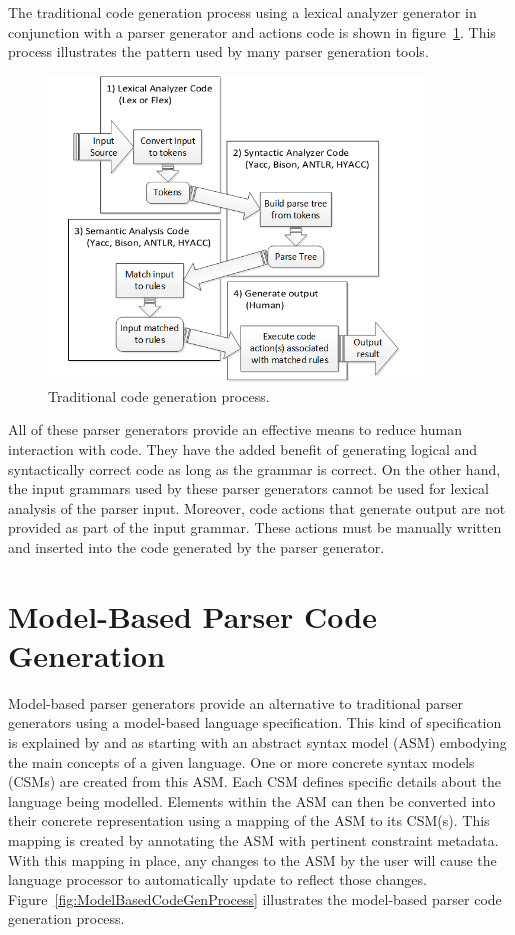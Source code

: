\indent
The traditional code generation process using a lexical analyzer generator in conjunction with a parser generator and actions code is shown in figure~\ref{fig:TraditionalCodeGenProcess}.  This process illustrates the pattern used by many parser generation tools.

\begin{figure}[h!]
\centering
\includegraphics[width=0.9\textwidth]{figures/TraditionalCodeGenProcess.png}
\caption{Traditional code generation process.}
\label{fig:TraditionalCodeGenProcess}
\end{figure}

\indent
All of these parser generators provide an effective means to reduce human interaction with code.  They have the added benefit of generating logical and syntactically correct code as long as the grammar is correct.  On the other hand, the input grammars used by these parser generators cannot be used for lexical analysis of the parser input.  Moreover, code actions that generate output are not provided as part of the input grammar.  These actions must be manually written and inserted into the code generated by the parser generator.

\section{Model-Based Parser Code Generation}

\indent
Model-based parser generators provide an alternative to traditional parser generators using a model-based language specification.  This kind of specification is explained by \cite{quesada_01} and \cite{quesada_02} as starting with an abstract syntax model (ASM) embodying the main concepts of a given language.  One or more concrete syntax models (CSMs) are created from this ASM.  Each CSM defines specific details about the language being modelled.  Elements within the ASM can then be converted into their concrete representation using a mapping of the ASM to its CSM(s).  This mapping is created by annotating the ASM with pertinent constraint metadata.  With this mapping in place, any changes to the ASM by the user will cause the language processor to automatically update to reflect those changes.  Figure~\ref{fig:ModelBasedCodeGenProcess} illustrates the model-based parser code generation process.

